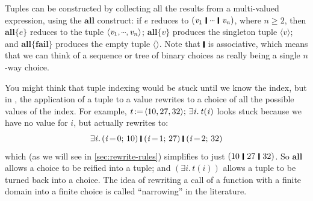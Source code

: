 \documentclass[acmsmall]{acmart}
\newcommand{\Varid}[1]{\mathit{#1}}
\renewcommand{\geq}{\geqslant}
\begin{document}
Tuples can be constructed by collecting all the results from a multi-valued expression, using the \ensuremath{\textbf{all}} construct:
if \ensuremath{\Varid{e}} reduces to \ensuremath{(\Varid{v}_{\mathrm{1}}\hspace{0.2em}\mathop{\rule[-0.1em]{0.15em}{0.75em}}\hspace{0.2em}\mydots\hspace{0.2em}\mathop{\rule[-0.1em]{0.15em}{0.75em}}\hspace{0.2em}\Varid{v}_{\Varid{n}})}, where $n \geq 2$, then \ensuremath{\textbf{all}\{\Varid{e}\}} reduces to
the tuple \ensuremath{\langle{}\Varid{v}_{\mathrm{1}},\mydots,\Varid{v}_{\Varid{n}}\rangle}; \ensuremath{\textbf{all}\{\Varid{v}\}} produces the singleton tuple \ensuremath{\langle{}\Varid{v}\rangle}; and \ensuremath{\textbf{all}\{\textbf{fail}\}} produces the empty tuple \ensuremath{\langle\rangle}.
Note that \ensuremath{\rule[-0.1em]{0.15em}{0.75em}} is associative, which means that we
can think of a sequence or tree of binary choices as really being a single
$n$-way choice.
\label{sec:all}

You might think that tuple indexing would be stuck until we know the index,
but in \versecalc{}, the application of a tuple to a value rewrites to a choice of all the possible
values of the index.
For example,
\ensuremath{\Varid{t}\hspace{-0.14em}:=\hspace{-0.14em}\langle{}\mathrm{10},\mathrm{27},\mathrm{32}\rangle;\,\exists\Varid{i}.\,\Varid{t}(\Varid{i})}
looks stuck because we have no value for \ensuremath{\Varid{i}}, but actually rewrites to:
$$
\ensuremath{\exists\Varid{i}.\,(\Varid{i}\hspace{-0.14em}=\hspace{-0.14em}\mathrm{0};\,\mathrm{10})\;\rule[-0.1em]{0.15em}{0.75em}\;(\Varid{i}\hspace{-0.14em}=\hspace{-0.14em}\mathrm{1};\,\mathrm{27})\;\rule[-0.1em]{0.15em}{0.75em}\;(\Varid{i}\hspace{-0.14em}=\hspace{-0.14em}\mathrm{2};\,\mathrm{32})}
$$
which (as we will see in \cref{sec:rewrite-rules}) simplifies
to just \ensuremath{(\mathrm{10}\hspace{0.2em}\mathop{\rule[-0.1em]{0.15em}{0.75em}}\hspace{0.2em}\mathrm{27}\hspace{0.2em}\mathop{\rule[-0.1em]{0.15em}{0.75em}}\hspace{0.2em}\mathrm{32})}.
So \ensuremath{\textbf{all}} allows a choice to be reified into a tuple; and \ensuremath{(\exists\Varid{i}.\,\Varid{t}(\Varid{i}))} allows a
tuple to be turned back into a choice.
The idea of rewriting a call of a function with a finite domain into a finite choice
is called ``narrowing'' in the literature.
\end{document}
